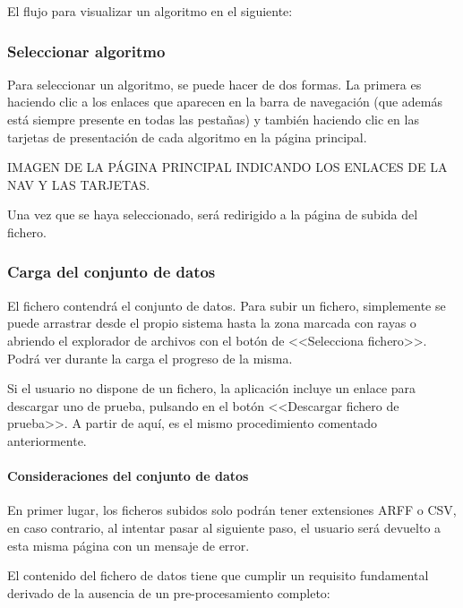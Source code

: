El flujo para visualizar un algoritmo en el siguiente:


\subsubsection{Seleccionar algoritmo}
Para seleccionar un algoritmo, se puede hacer de dos formas. La primera es
haciendo clic a los enlaces que aparecen en la barra de navegación (que además
está siempre presente en todas las pestañas) y también haciendo clic en las
tarjetas de presentación de cada algoritmo en la página principal.

IMAGEN DE LA PÁGINA PRINCIPAL INDICANDO LOS ENLACES DE LA NAV Y LAS TARJETAS.

Una vez que se haya seleccionado, será redirigido a la página de subida del
fichero. 

\subsubsection{Carga del conjunto de datos}

El fichero contendrá el conjunto de datos. Para subir un fichero, simplemente se
puede arrastrar desde el propio sistema hasta la zona marcada con rayas o
abriendo el explorador de archivos con el botón de <<Selecciona fichero>>. Podrá
ver durante la carga el progreso de la misma.

Si el usuario no dispone de un fichero, la aplicación incluye un enlace para
descargar uno de prueba, pulsando en el botón <<Descargar fichero de prueba>>. A
partir de aquí, es el mismo procedimiento comentado anteriormente.


\paragraph{Consideraciones del conjunto de datos} En primer lugar, los ficheros
subidos solo podrán tener extensiones ARFF o CSV, en caso contrario, al intentar
pasar al siguiente paso, el usuario será devuelto a esta misma página con un
mensaje de error.

El contenido del fichero de datos tiene que cumplir un requisito fundamental
derivado de la ausencia de un pre-procesamiento completo: 

